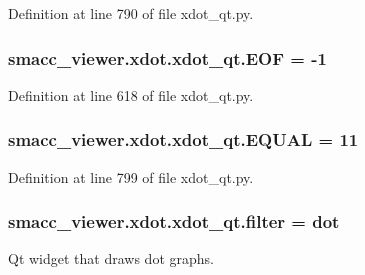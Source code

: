 Definition at line 790 of file xdot\+\_\+qt.\+py.

\subsubsection[{\texorpdfstring{E\+OF}{EOF}}]{ smacc\+\_\+viewer.\+xdot.\+xdot\+\_\+qt.\+E\+OF = -\/1}\hypertarget{namespacesmacc__viewer_1_1xdot_1_1xdot__qt_a632eb3def9c4ff8ad43916a2bed70658}{}\label{namespacesmacc__viewer_1_1xdot_1_1xdot__qt_a632eb3def9c4ff8ad43916a2bed70658}


Definition at line 618 of file xdot\+\_\+qt.\+py.

\subsubsection[{\texorpdfstring{E\+Q\+U\+AL}{EQUAL}}]{ smacc\+\_\+viewer.\+xdot.\+xdot\+\_\+qt.\+E\+Q\+U\+AL = 11}\hypertarget{namespacesmacc__viewer_1_1xdot_1_1xdot__qt_a5c5f99e459885969ed1110510f6aa63f}{}\label{namespacesmacc__viewer_1_1xdot_1_1xdot__qt_a5c5f99e459885969ed1110510f6aa63f}


Definition at line 799 of file xdot\+\_\+qt.\+py.

\subsubsection[{\texorpdfstring{filter}{filter}}]{\setlength{\rightskip}{0pt plus 5cm}smacc\+\_\+viewer.\+xdot.\+xdot\+\_\+qt.\+filter = \textquotesingle{}dot\textquotesingle{}}\hypertarget{namespacesmacc__viewer_1_1xdot_1_1xdot__qt_a3e281a7b487568916dc614e2edd9f120}{}\label{namespacesmacc__viewer_1_1xdot_1_1xdot__qt_a3e281a7b487568916dc614e2edd9f120}
\begin{DoxyVerb}Qt widget that draws dot graphs.\end{DoxyVerb}
 

